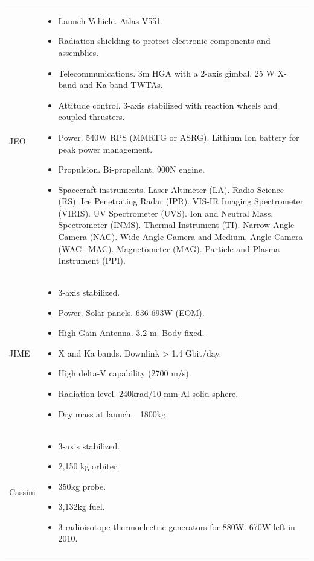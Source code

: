 \begin{supertabular}{p{.1\textwidth}p{.9\textwidth}}
  JEO &
  \begin{itemize}
  \item Launch Vehicle. Atlas V551.
  \item Radiation shielding to protect electronic components and
    assemblies.
  \item Telecommunications. 3m HGA with a 2-axis gimbal. 25 W X-band
    and Ka-band TWTAs.
  \item Attitude control. 3-axis stabilized with reaction wheels and
    coupled thrusters.
  \item Power. 540W RPS (MMRTG or ASRG). Lithium Ion battery for peak
    power management.
  \item Propulsion. Bi-propellant, 900N engine.
  \item Spacecraft instruments. Laser Altimeter (LA). Radio Science
    (RS). Ice Penetrating Radar (IPR).  VIS-IR Imaging Spectrometer
    (VIRIS).  UV Spectrometer (UVS).  Ion and Neutral Mass,
    Spectrometer (INMS).  Thermal Instrument (TI).  Narrow Angle
    Camera (NAC).  Wide Angle Camera and Medium, Angle Camera
    (WAC+MAC).  Magnetometer (MAG).  Particle and Plasma Instrument
    (PPI).
  \end{itemize} \\

  JIME &
  \begin{itemize}
  \item 3-axis stabilized.
  \item Power. Solar panels. 636-693W (EOM).
  \item High Gain Antenna. 3.2 m. Body fixed.
  \item X and Ka bands. Downlink > 1.4 Gbit/day.
  \item High delta-V capability (2700 m/s).
  \item Radiation level. 240krad/10 mm Al solid sphere.
  \item Dry mass at launch. ~1800kg.
  \end{itemize} \\

  Cassini &
  \begin{itemize}
  \item 3-axis stabilized.
  \item 2,150 kg orbiter.
  \item 350kg probe.
  \item  3,132kg fuel.
  \item 3 radioisotope thermoelectric generators for 880W. 670W left
    in 2010.
  \end{itemize} \\


\end{supertabular}
